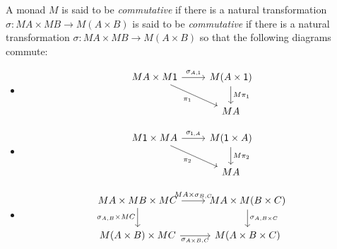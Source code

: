 \documentclass[DynamicalBook]{subfiles}
\begin{document}
\begin{definition}
A monad $M$ is said to be \emph{commutative} if there is a natural
transformation $\sigma : MA \times MB \to M(A \times B)$ is said to be
\emph{commutative} if there is a natural transformation $\sigma : MA \times MB
\to M(A \times B)$ so that the following diagrams commute:
\begin{itemize}
\item 
  \begin{equation}\label{eqn.com_monad_right_unit}
    \begin{tikzcd}
      MA \times M\ord{1} \ar[dr, "\pi_1"'] \ar[r, "\sigma_{A, \ord{1}}"]& M(A
      \times \ord{1}) \ar[d, "M\pi_1"] \\
      & MA
    \end{tikzcd}
    \end{equation}
\item 
  \begin{equation}\label{eqn.com_monad_left_unit}
    \begin{tikzcd}
      M\ord{1} \times MA \ar[dr, "\pi_2"'] \ar[r, "\sigma_{\ord{1}, A}"]& M(\ord{1}
      \times A) \ar[d, "M\pi_2"] \\
      & MA
    \end{tikzcd}
    \end{equation}
\item 
\begin{equation}\label{eqn.com_monad_assoc} 
    \begin{tikzcd}
      MA \times MB \times MC \ar[r, "MA \times \sigma_{B, C}"] \ar[d,"\sigma_{A,
      B} \times MC"'] & MA \times M(B \times C) \ar[d, "\sigma_{A, B \times C}"]
    \\
    M(A \times B) \times MC \ar[r, "\sigma_{A \times B, C}"'] & M(A \times B
    \times C)
    \end{tikzcd}
    \end{equation}
\end{itemize}
\end{definition}
\end{document}
